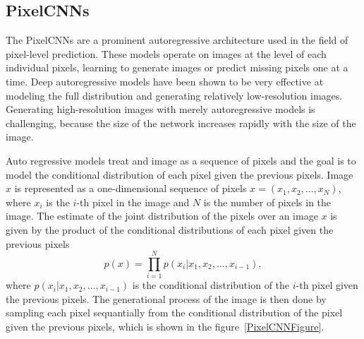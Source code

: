 \subsection{PixelCNNs}

The PixelCNNs are a prominent autoregressive architecture used in the field of pixel-level prediction. These models operate on images at the level of each individual pixels, learning to generate images or predict missing pixels one at a time. Deep autoregressive models have been shown to be very effective at modeling the full distribution and generating relatively low-resolution images. Generating high-resolution images with merely autoregressive models is challenging, because the size of the network increases rapidly with the size of the image.\cite{pixelcnn, pixelrnn}

Auto regressive models treat and image as a sequence of pixels and the goal is to model the conditional distribution of each pixel given the previous pixels.
Image $x$ is represented as a one-dimensional sequence of pixels $x = (x_1, x_2, \dots, x_N)$, where $x_i$ is the $i$-th pixel in the image and $N$ is the number of pixels in the image. The estimate of the joint distribution of the pixels over an image $x$ is given by the product of the conditional distributions of each pixel given the previous pixels
\[ p(x) = \prod_{i=1}^{N} p(x_i|x_1, x_2, \dots, x_{i-1}),\]
where $p(x_i|x_1, x_2, \dots, x_{i-1})$ is the conditional distribution of the $i$-th pixel given the previous pixels. The generational process of the image is then done by sampling each pixel sequantially from the conditional distribution of the pixel given the previous pixels, which is shown in the figure~\ref{PixelCNNFigure}.\cite{pixelcnn}


